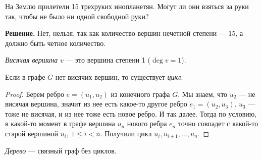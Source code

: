 \documentclass[russian]{lecture-notes}
\begin{document}
	\begin{problem}
		На Землю прилетели 15 трехруких инопланетян. Могут ли они взяться за руки так, чтобы не было ни одной свободной руки?
	\end{problem}
	\textbf{Решение.} Нет, нельзя, так как количество вершин нечетной степени --- 15, а должно быть четное количество.
	
	\begin{definition}
		\textit{Висячая вершина} $v$ --- это вершина степени 1 ($\deg v = 1$).
	\end{definition}
	
	\begin{theorem}
		Если в графе $G$ нет висячих вершин, то существует \textit{цикл}.
	\end{theorem}
	
	\begin{proof}
		Берем ребро $e = (u_1, u_2)$ из конечного графа $G$. Мы знаем, что $u_2$ --- не висячая вершина, значит из нее есть какое-то другое ребро $e_1 = (u_2, u_3)$. $u_3$ --- тоже не висячая, и из нее тоже есть новое ребро. И так далее. Тогда по условию, в какой-то момент в графе вершина $u_n$ нового ребра $e_n$ точно совпадет с какой-то старой вершиной $u_i,~1 \leq i < n$. Получили цикл $u_i, u_{i+1}, \dots, u_n$.
	\end{proof}
	
	\begin{definition}
		\textit{Дерево} --- связный граф без циклов.
	\end{definition}
	
\end{document}
